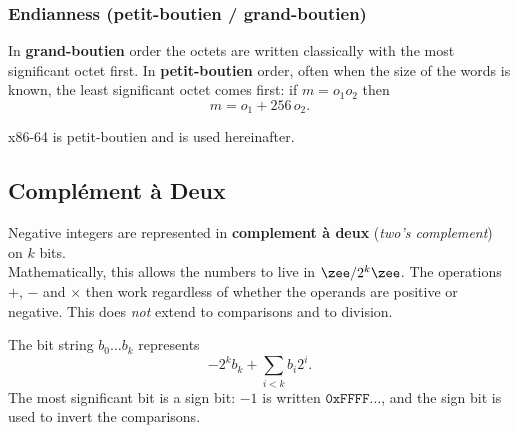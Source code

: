 \subsubsection{Endianness (petit-boutien / grand-boutien)}
\begin{definition}
  In \textbf{grand-boutien} order the octets are written classically with the
  most significant octet first. In \textbf{petit-boutien} order, often when the
  size of the words is known, the least significant octet comes first: if $m =
  o_1 o_2$ then
  \[
    m = o_1 + 256\, o_2 .
  \]
\end{definition}
\begin{figure}[h!]
  \centering
\end{figure}
\begin{remark}
  x86-64 is petit-boutien and is used hereinafter.
\end{remark}

\subsection{Complément à Deux}
Negative integers are represented in \textbf{complement à deux} (\textit{two's
complement}) on $k$ bits.\\

Mathematically, this allows the numbers to live in $\zee/2^{k}\zee$. The
operations $+$, $-$ and $\times$ then work regardless of whether the operands
are positive or negative. This does \emph{not} extend to comparisons and to
division.

\begin{definition}
  The bit string $b_0 \ldots b_k$ represents
  \[
    -2^{k} b_{k} + \sum_{i<k} b_i 2^{i}.
  \]
  The most significant bit is a sign bit: $-1$ is written
  $\mathtt{0xFFFF}\ldots$, and the sign bit is used to invert the comparisons.
\end{definition}

